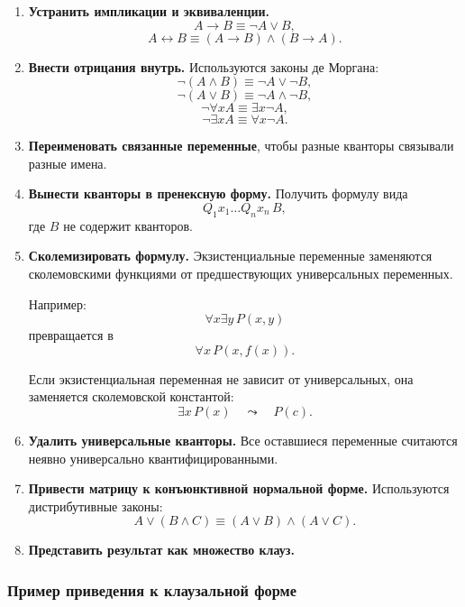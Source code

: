 \documentclass[12pt,a4paper]{article}
\begin{document}
\begin{enumerate}
    \item \textbf{Устранить импликации и эквиваленции.}
    $$
    A \to B \equiv \neg A \lor B,
    $$
    $$
    A \leftrightarrow B \equiv (A \to B)\land(B \to A).
    $$

    \item \textbf{Внести отрицания внутрь.}
    Используются законы де Моргана:
    $$
    \neg(A\land B) \equiv \neg A \lor \neg B,
    $$
    $$
    \neg(A\lor B) \equiv \neg A \land \neg B,
    $$
    $$
    \neg \forall x A \equiv \exists x \neg A,
    $$
    $$
    \neg \exists x A \equiv \forall x \neg A.
    $$

    \item \textbf{Переименовать связанные переменные}, чтобы разные кванторы связывали разные имена.

    \item \textbf{Вынести кванторы в пренексную форму.}
    Получить формулу вида
    $$
    Q_1x_1\dots Q_nx_n\, B,
    $$
    где $B$ не содержит кванторов.

    \item \textbf{Сколемизировать формулу.}
    Экзистенциальные переменные заменяются сколемовскими функциями от предшествующих универсальных переменных.

    Например:
    $$
    \forall x \exists y\, P(x,y)
    $$
    превращается в
    $$
    \forall x\, P(x,f(x)).
    $$

    Если экзистенциальная переменная не зависит от универсальных, она заменяется сколемовской константой:
    $$
    \exists x\, P(x)
    \quad\leadsto\quad
    P(c).
    $$

    \item \textbf{Удалить универсальные кванторы.}
    Все оставшиеся переменные считаются неявно универсально квантифицированными.

    \item \textbf{Привести матрицу к конъюнктивной нормальной форме.}
    Используются дистрибутивные законы:
    $$
    A \lor (B\land C) \equiv (A\lor B)\land(A\lor C).
    $$

    \item \textbf{Представить результат как множество клауз.}
\end{enumerate}

\subsubsection{Пример приведения к клаузальной форме}
\end{document}

